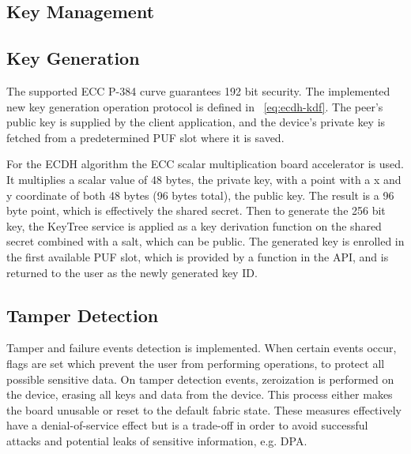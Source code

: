 \subsection{Key Management}\label{chap:implementation:services:key-import}

\subsection{Key Generation}\label{chap:implementation:services:key-generation}

The supported \ac{ECC} P-384 curve guarantees 192 bit security.
The implemented new key generation operation protocol is defined in ~\ref{eq:ecdh-kdf}.
The peer's public key is supplied by the client application, and the device's private key is fetched from a predetermined PUF slot where it is saved.

For the ECDH algorithm the ECC scalar multiplication board accelerator is used. It multiplies a scalar value of 48 bytes, the private key, with a point with a x and y coordinate of both 48 bytes (96 bytes total), the public key.
The result is a 96 byte point, which is effectively the shared secret.
Then to generate the 256 bit key, the KeyTree service is applied as a key derivation function on the shared secret combined with a salt, which can be public.
The generated key is enrolled in the first available PUF slot, which is provided by a function in the API, and is returned to the user as the newly generated key ID.

\subsection{Tamper Detection}\label{chap:implementation:services:tamper-detection}

Tamper and failure events detection is implemented. When certain events occur, flags are set which prevent the user from performing operations, to protect all possible sensitive data.
On tamper detection events, zeroization is performed on the device, erasing all keys and data from the device. This process either makes the board unusable or reset to the default fabric state.
These measures effectively have a denial-of-service effect but is a trade-off in order to avoid successful attacks and potential leaks of sensitive information, e.g. \ac{DPA}.

